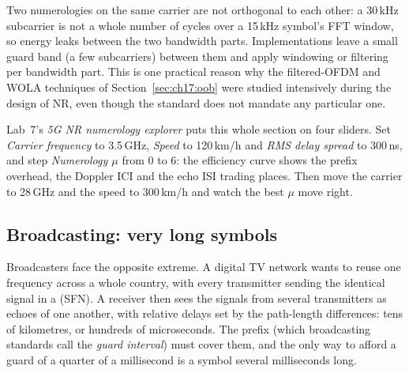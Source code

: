 
\begin{inpractice}
Two numerologies on the same carrier are not orthogonal to each other: a 30\,kHz subcarrier is
not a whole number of cycles over a 15\,kHz symbol's FFT window, so energy leaks between the two
bandwidth parts. Implementations leave a small guard band (a few subcarriers) between them and apply
windowing or filtering per bandwidth part. This is one practical reason why the filtered-OFDM and WOLA
techniques of Section~\ref{sec:ch17:oob} were studied intensively during the design of NR, even though the
standard does not mandate any particular one.
\end{inpractice}

\begin{tryit}
Lab~7's \emph{5G NR numerology explorer} puts this whole section on four sliders. Set
\emph{Carrier frequency} to 3.5\,GHz, \emph{Speed} to 120\,km/h and \emph{RMS delay spread} to
300\,ns, and step \emph{Numerology $\mu$} from 0 to 6: the efficiency curve shows the prefix
overhead, the Doppler ICI and the echo ISI trading places. Then move the carrier to 28\,GHz and
the speed to 300\,km/h and watch the best $\mu$ move right.
\end{tryit}

\subsection{Broadcasting: very long symbols}

Broadcasters face the opposite extreme. A digital TV network wants to reuse one frequency across a whole
country, with every transmitter sending the identical signal in a  (SFN).
A receiver then sees the signals from several transmitters as echoes of one another, with relative delays set by
the path-length differences: tens of kilometres, or hundreds of microseconds. The prefix (which broadcasting
standards call the \emph{guard interval}) must cover them, and the only way to afford a guard of a
quarter of a millisecond is a symbol several milliseconds long.

